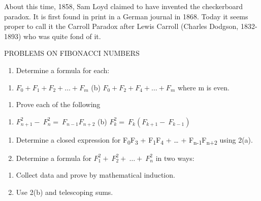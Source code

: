 \documentclass[10pt,letter]{article}
\begin{document}
About this time, 1858, Sam Loyd claimed to have invented the
checkerboard paradox. It is first found in print in a German journal in
1868. Today it seems proper to call it the Carroll Paradox after Lewis
Carroll (Charles Dodgson, 1832-1893) who was quite fond of it.

PROBLEMS ON FIBONACCI NUMBERS

\begin{enumerate}
\def\labelenumi{\arabic{enumi}.}

\item
  Determine a formula for each:

\end{enumerate}

\begin{enumerate}
\def\labelenumi{(\alph{enumi})}

\item
  \(F_{0} + F_{1} + F_{2} + \ldots + F_{m}\) (b)
  \(F_{0} + F_{2} + F_{4} + \ldots + F_{m}\) where m is even.

\end{enumerate}

\begin{enumerate}
\def\labelenumi{\arabic{enumi}.}

\item
  Prove each of the following

\end{enumerate}

\begin{enumerate}
\def\labelenumi{(\alph{enumi})}

\item
  \(F_{n + 1}^{2} - \ F_{n}^{2} = \ F_{n - 1}F_{n + 2}\) (b)
  \(F_{k}^{2} = \ F_{k}(F_{k + 1} - \ F_{k - 1})\)

\end{enumerate}

\begin{enumerate}
\def\labelenumi{\arabic{enumi}.}

\item
  Determine a closed expression for F\textsubscript{0}F\textsubscript{3}
  + F\textsubscript{1}F\textsubscript{4} + \ldots{} +
  F\textsubscript{n-1}F\textsubscript{n+2} using 2(a).
\item
  Determine a formula for
  \(F_{1}^{2} + \ F_{2}^{2} + \ \ldots + \ F_{n}^{2}\) in two ways:

\end{enumerate}

\begin{enumerate}
\def\labelenumi{(\alph{enumi})}

\item
  Collect data and prove by mathematical induction.
\item
  Use 2(b) and telescoping sums.

\end{enumerate}
\end{document}
